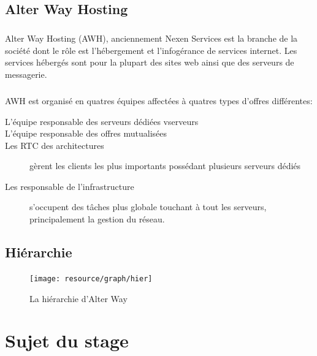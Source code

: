 \section{Alter Way Hosting}
\paragraph*{}
Alter Way Hosting (AWH), anciennement Nexen Services est la branche de la société dont le rôle est l'hébergement et l'infogérance de services internet.
Les services hébergés sont pour la plupart des sites web ainsi que des serveurs de messagerie.

\paragraph*{}
AWH est organisé en quatres équipes affectées à quatres types d'offres différentes:

\begin{description}
	\item[L'équipe responsable des serveurs dédiées vserveurs \footnotemark]
	\item[L'équipe responsable des offres mutualisées
		\footnotemark] 
	\item[Les RTC \footnotemark des architectures] 
		gèrent les clients les plus importants possédant plusieurs serveurs dédiés
	\item[Les responsable de l'infrastructure] s'occupent des tâches plus globale touchant à tout les serveurs,
		principalement la gestion du réseau.

\end{description}


\section{Hiérarchie}

\begin{figure}[H]
	\centering
	\texttt{[image: resource/graph/hier]}
	\caption{La hiérarchie d'Alter Way}
\end{figure}

\chapter{Sujet du stage}

